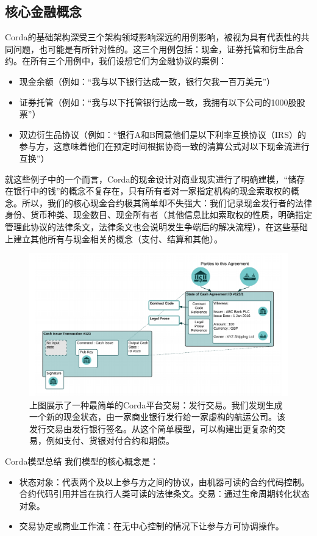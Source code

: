 \documentclass[UTF8]{ctexart}
\begin{document}
\subsection{核心金融概念}
Corda的基础架构深受三个架构领域影响深远的用例影响，被视为具有代表性的共同问题，也可能是有所针对性的。这三个用例包括：现金，证券托管和衍生品合约。在所有三个用例中，我们设想它们为金融协议的案例：
\begin{itemize}
\item 现金余额（例如：“我与以下银行达成一致，银行欠我一百万美元”）
\item 证券托管（例如：“我与以下托管银行达成一致，我拥有以下公司的1000股股票”）
\item 双边衍生品协议（例如：“银行A和B同意他们是以下利率互换协议（IRS）的参与方，这意味着他们在预定时间根据协商一致的清算公式对以下现金流进行互换”）
\end{itemize}
就这些例子中的一个而言，Corda的现金设计对商业现实进行了明确建模，“储存在银行中的钱”的概念不复存在，只有所有者对一家指定机构的现金索取权的概念。\cite{BOE}所以，我们的核心现金合约极其简单却不失强大：我们记录现金发行者的法律身份、货币种类、现金数目、现金所有者（其他信息比如索取权的性质，明确指定管理此协议的法律条文，法律条文也会说明发生争端后的解决流程），在这些基础上建立其他所有与现金相关的概念（支付、结算和其他）。
\begin{figure}[H]
\includegraphics[scale = .4, center]{cash}
上图展示了一种最简单的Corda平台交易：发行交易。我们发现生成一个新的现金状态，由一家商业银行发行给一家虚构的航运公司。该发行交易由发行银行签名。从这个简单模型，可以构建出更复杂的交易，例如支付、货银对付合约和期债。
\end{figure}
Corda模型总结
我们模型的核心概念是：
\begin{itemize}
\item 状态对象：代表两个及以上参与方之间的协议，由机器可读的合约代码控制。合约代码引用并旨在执行人类可读的法律条文。交易：通过生命周期转化状态对象。
\item 交易协定或商业工作流：在无中心控制的情况下让参与方可协调操作。
\end{itemize}
\end{document}

